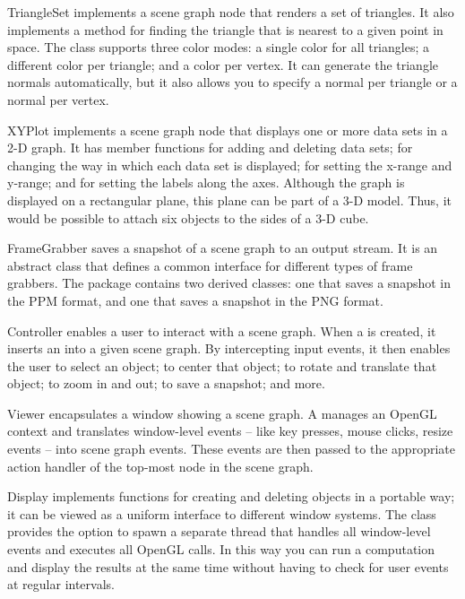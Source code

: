 \documentclass[a4paper,10pt]{article}
\begin{document}
\begin{Description}[\Code]
\item[TriangleSet] implements a scene graph node that renders a set of
  triangles. It also implements a method for finding the triangle that is
  nearest to a given point in space. The  class
  supports three color modes: a single color for all triangles; a
  different color per triangle; and a color per vertex. It can generate
  the triangle normals automatically, but it also allows you to specify a
  normal per triangle or a normal per vertex.

\item[XYPlot] implements a scene graph node that displays one or more
  data sets in a 2-D graph. It has member functions for adding and
  deleting data sets; for changing the way in which each data set is
  displayed; for setting the x-range and y-range; and for setting the
  labels along the axes. Although the graph is displayed on a rectangular
  plane, this plane can be part of a 3-D model. Thus, it would be
  possible to attach six  objects to the sides of a 3-D
  cube.

\item[FrameGrabber] saves a snapshot of a scene graph to an output
  stream. It is an abstract class that defines a common interface for
  different types of frame grabbers. The  package contains two
  derived classes: one that saves a snapshot in the PPM format, and one
  that saves a snapshot in the PNG format.

\item[Controller] enables a user to interact with a scene graph. When a
   is created, it inserts an  into a
  given scene graph. By intercepting input events, it then enables the
  user to select an object; to center that object; to rotate and
  translate that object; to zoom in and out; to save a snapshot; and
  more.

\item[Viewer] encapsulates a window showing a scene graph. A
   manages an OpenGL context and translates window-level
  events -- like key presses, mouse clicks, resize events -- into scene
  graph events. These events are then passed to the appropriate action
  handler of the top-most node in the scene graph.

\item[Display] implements functions for creating and deleting
   objects in a portable way; it can be viewed as a uniform
  interface to different window systems. The  class
  provides the option to spawn a separate thread that handles all
  window-level events and executes all OpenGL calls. In this way you can
  run a computation and display the results at the same time without
  having to check for user events at regular intervals.

\end{Description}
\end{document}
